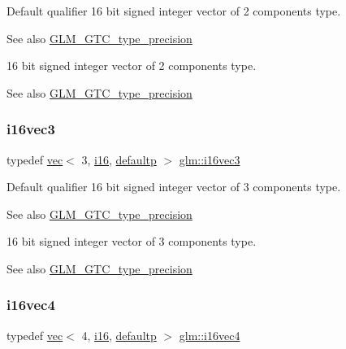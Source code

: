 Default qualifier 16 bit signed integer vector of 2 components type. \begin{DoxySeeAlso}{See also}
\mbox{\hyperlink{group__gtc__type__precision}{G\+L\+M\+\_\+\+G\+T\+C\+\_\+type\+\_\+precision}}
\end{DoxySeeAlso}
16 bit signed integer vector of 2 components type. \begin{DoxySeeAlso}{See also}
\mbox{\hyperlink{group__gtc__type__precision}{G\+L\+M\+\_\+\+G\+T\+C\+\_\+type\+\_\+precision}} 
\end{DoxySeeAlso}
\mbox{\label{group__gtc__type__precision_ga1f2b1dd6e4d9109be5f4433c8ff38cb8}} 
\subsubsection{\texorpdfstring{i16vec3}{i16vec3}}
{\footnotesize\ttfamily typedef \mbox{\hyperlink{structglm_1_1vec}{vec}}$<$ 3, \mbox{\hyperlink{group__gtc__type__precision_ga35e5542ca05b29cc256fdafb8503d1fd}{i16}}, \mbox{\hyperlink{namespaceglm_a36ed105b07c7746804d7fdc7cc90ff25a9d21ccd8b5a009ec7eb7677befc3bf51}{defaultp}} $>$ \mbox{\hyperlink{group__gtc__type__precision_ga1f2b1dd6e4d9109be5f4433c8ff38cb8}{glm\+::i16vec3}}}

Default qualifier 16 bit signed integer vector of 3 components type. \begin{DoxySeeAlso}{See also}
\mbox{\hyperlink{group__gtc__type__precision}{G\+L\+M\+\_\+\+G\+T\+C\+\_\+type\+\_\+precision}}
\end{DoxySeeAlso}
16 bit signed integer vector of 3 components type. \begin{DoxySeeAlso}{See also}
\mbox{\hyperlink{group__gtc__type__precision}{G\+L\+M\+\_\+\+G\+T\+C\+\_\+type\+\_\+precision}} 
\end{DoxySeeAlso}
\mbox{\label{group__gtc__type__precision_ga99a249a4cc129cb527c48d3afd38b666}} 
\subsubsection{\texorpdfstring{i16vec4}{i16vec4}}
{\footnotesize\ttfamily typedef \mbox{\hyperlink{structglm_1_1vec}{vec}}$<$ 4, \mbox{\hyperlink{group__gtc__type__precision_ga35e5542ca05b29cc256fdafb8503d1fd}{i16}}, \mbox{\hyperlink{namespaceglm_a36ed105b07c7746804d7fdc7cc90ff25a9d21ccd8b5a009ec7eb7677befc3bf51}{defaultp}} $>$ \mbox{\hyperlink{group__gtc__type__precision_ga99a249a4cc129cb527c48d3afd38b666}{glm\+::i16vec4}}}


